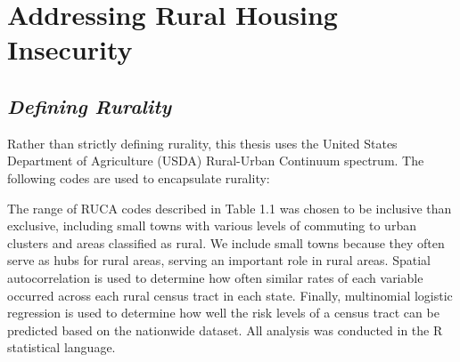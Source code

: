 \chapter{Addressing Rural Housing Insecurity}	%

\section{\textit{Defining Rurality}}
Rather than strictly defining rurality, this thesis uses the United States Department of Agriculture (USDA) Rural-Urban Continuum spectrum. The following codes are used to encapsulate rurality:




The range of RUCA codes described in Table 1.1 was chosen to be inclusive than exclusive, including small towns with various levels of commuting to urban clusters and areas classified as rural. We include small towns because they often serve as hubs for rural areas, serving an important role in rural areas. Spatial autocorrelation is used to determine how often similar rates of each variable occurred across each rural census tract in each state. Finally, multinomial logistic regression is used to determine how well the risk levels of a census tract can be predicted based on the nationwide dataset.  All analysis was conducted in the R statistical language.  

